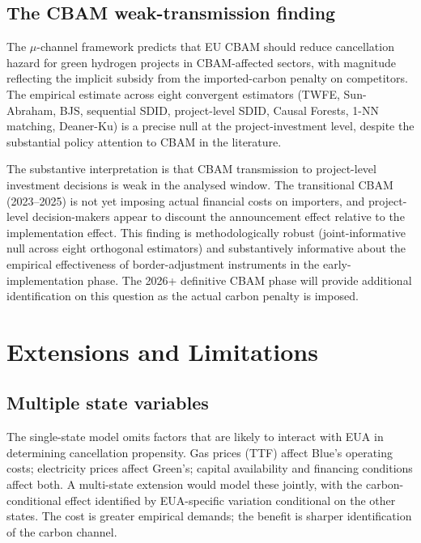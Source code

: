 \subsection{The CBAM weak-transmission finding}
\label{sec:ch3-mechanism-cbam-summary}

The $\mu$-channel framework predicts that EU CBAM should reduce cancellation hazard for green hydrogen projects in CBAM-affected sectors, with magnitude reflecting the implicit subsidy from the imported-carbon penalty on competitors. The empirical estimate across eight convergent estimators (TWFE, Sun-Abraham, BJS, sequential SDID, project-level SDID, Causal Forests, 1-NN matching, Deaner-Ku) is a precise null at the project-investment level, despite the substantial policy attention to CBAM in the literature.

The substantive interpretation is that CBAM transmission to project-level investment decisions is weak in the analysed window. The transitional CBAM (2023--2025) is not yet imposing actual financial costs on importers, and project-level decision-makers appear to discount the announcement effect relative to the implementation effect. This finding is methodologically robust (joint-informative null across eight orthogonal estimators) and substantively informative about the empirical effectiveness of border-adjustment instruments in the early-implementation phase. The 2026+ definitive CBAM phase will provide additional identification on this question as the actual carbon penalty is imposed.

\section{Extensions and Limitations}
\label{sec:ch3-extensions}

\subsection{Multiple state variables}

The single-state model omits factors that are likely to interact with EUA in determining cancellation propensity. Gas prices (TTF) affect Blue's operating costs; electricity prices affect Green's; capital availability and financing conditions affect both. A multi-state extension would model these jointly, with the carbon-conditional effect identified by EUA-specific variation conditional on the other states. The cost is greater empirical demands; the benefit is sharper identification of the carbon channel.

